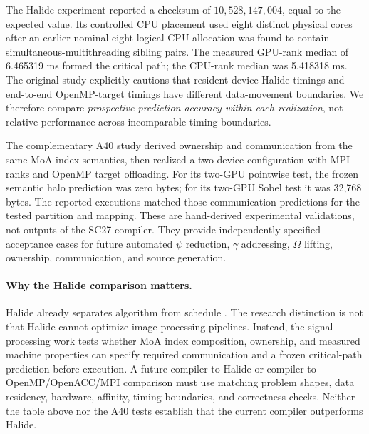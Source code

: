 \documentclass[11pt]{article}
\begin{document}
The Halide experiment reported a checksum of $10{,}528{,}147{,}004$, equal to the expected value. Its controlled CPU placement used eight distinct physical cores after an earlier nominal eight-logical-CPU allocation was found to contain simultaneous-multithreading sibling pairs. The measured GPU-rank median of 6.465319 ms formed the critical path; the CPU-rank median was 5.418318 ms. The original study explicitly cautions that resident-device Halide timings and end-to-end OpenMP-target timings have different data-movement boundaries. We therefore compare \emph{prospective prediction accuracy within each realization}, not relative performance across incomparable timing boundaries.

The complementary A40 study \cite{a40report} derived ownership and communication from the same MoA index semantics, then realized a two-device configuration with MPI ranks and OpenMP target offloading. For its two-GPU pointwise test, the frozen semantic halo prediction was zero bytes; for its two-GPU Sobel test it was 32,768 bytes. The reported executions matched those communication predictions for the tested partition and mapping. These are hand-derived experimental validations, not outputs of the SC27 compiler. They provide independently specified acceptance cases for future automated $\psi$ reduction, $\gamma$ addressing, $\Omega$ lifting, ownership, communication, and source generation.

\paragraph{Why the Halide comparison matters.}
Halide already separates algorithm from schedule \cite{halide,halide2012}. The research distinction is not that Halide cannot optimize image-processing pipelines. Instead, the signal-processing work tests whether MoA index composition, ownership, and measured machine properties can specify required communication and a frozen critical-path prediction before execution. A future compiler-to-Halide or compiler-to-OpenMP/OpenACC/MPI comparison must use matching problem shapes, data residency, hardware, affinity, timing boundaries, and correctness checks. Neither the table above nor the A40 tests establish that the current compiler outperforms Halide.
\end{document}
